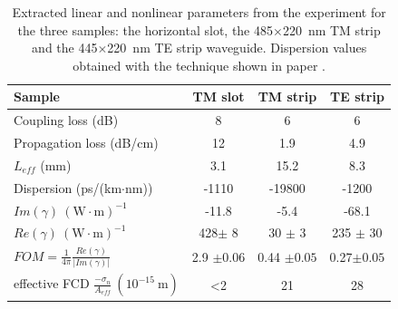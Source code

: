 \documentclass[10pt,letterpaper]{article}
\begin{document}
 \begin{table}[htb]
                        \centering
                        \caption{Extracted linear and nonlinear parameters from the experiment for the three samples: the horizontal slot, the  485$\times$220~nm TM strip and the  445$\times$220~nm TE strip waveguide. Dispersion values obtained with the technique shown in paper \cite{Mas2012}.}
                                \begin{tabular}{l|ccc}
                                        \hline
                                        Sample & TM slot & TM strip & TE strip\\\hline
                                        Coupling loss (dB) & 8 & 6 & 6\\
                                        Propagation loss (dB/cm) & 12 & 1.9 & 4.9\\
                                        $L_{eff}$ (mm) & 3.1 & 15.2 & 8.3\\
                                        Dispersion  (ps/(km$\cdot$nm))  & -1110 & -19800 & -1200\\
                                        $ Im(\gamma)~(\mathrm{W}\cdot \mathrm{m})^{-1} $          & -11.8 & -5.4 & -68.1\\
                                        $ Re(\gamma)~(\mathrm{W}\cdot \mathrm{m})^{-1} $          & 428$\pm$ 8 & 30 $\pm$ 3 & 235 $\pm$ 30\\
                                        $ FOM = \frac{1}{4\pi} \frac{Re(\gamma)}{|Im(\gamma)|} $  & 2.9 $\pm 0.06$ & 0.44 $\pm 0.05$ & 0.27$\pm 0.05$ \\
                                        effective FCD $ \frac{-\sigma_n}{ A_{eff} }~(10^{-15}~\mathrm{m}) $  & \textless 2 & 21 & 28 \\
                                        \hline
                                \end{tabular} 
\label{tab:results}
\end{table}
\end{document}
